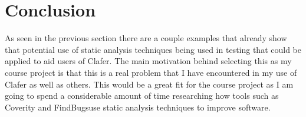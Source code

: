 \documentclass{article}
\begin{document}
\section{Conclusion}
As seen in the previous section there are a couple examples that already show that potential use of static analysis techniques being used in testing that could be applied to aid users of Clafer. The main motivation behind selecting this as my course project is that this is a real problem that I have encountered in my use of Clafer as well as others. This would be a great fit for the course project as I am going to spend a considerable amount of time researching how tools such as Coverity\textsuperscript{\textregistered} and FindBugs\texttrademark use static analysis techniques to improve software.

\medskip

\printbibliography
\end{document}

